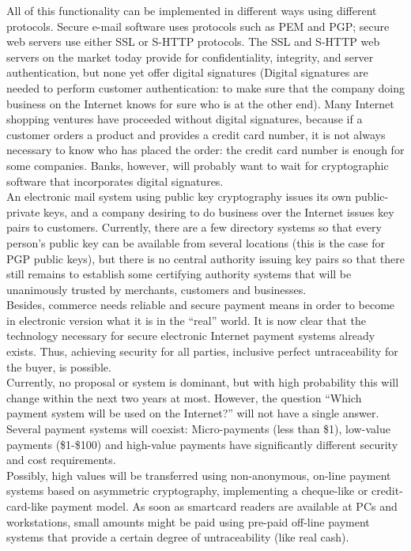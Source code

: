 All of this functionality can be implemented in different ways using
different protocols. Secure e-mail software uses protocols such as PEM and
PGP; secure web servers use either SSL or S-HTTP protocols. The SSL and
S-HTTP web servers on the market today provide for confidentiality,
integrity, and server authentication, but none yet offer digital signatures
(Digital signatures are needed to perform customer authentication: to make
sure that the company doing business on the Internet knows for sure who is
at the other end). Many Internet shopping ventures have proceeded without
digital signatures, because if a customer orders a product and provides a
credit card number, it is not always necessary to know who has placed the
order: the credit card number is enough for some companies. Banks, however,
will probably want
to wait for cryptographic software that incorporates digital signatures.\\

An electronic mail system using public key cryptography issues its own
public-private keys, and a company desiring to do business over the
Internet issues key pairs to customers. Currently, there are a few
directory systems so that every person's public key can be available
from several locations (this is the case for PGP public keys), but
there is no central authority issuing key pairs so that there still
remains to establish some certifying authority systems that will be
unanimously trusted by merchants, customers and businesses.\\

Besides, commerce needs reliable and secure payment means in order to
become in electronic version what it is in the ``real'' world. It is
now clear that the technology necessary for secure electronic Internet
payment systems already exists. Thus, achieving security for all
parties, inclusive perfect untraceability for the buyer, is possible.\\

Currently, no proposal or system is dominant, but with high probability
this will change within the next two years at most. However, the
question ``Which payment system will be used on the Internet?'' will
not have a single answer. Several payment systems will coexist:
Micro-payments (less than \$1), low-value payments (\$1-\$100) and
high-value payments have significantly different security and cost
requirements.\\

Possibly, high values will be transferred using non-anonymous, on-line
payment systems based on asymmetric cryptography, implementing a
cheque-like or credit-card-like payment model. As soon as smartcard
readers are available at PCs and workstations, small amounts might be
paid using pre-paid off-line payment systems that provide a certain
degree of untraceability (like real cash).\\

